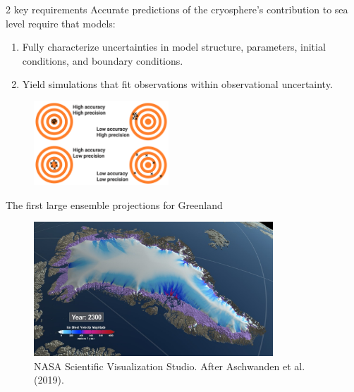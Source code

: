 \documentclass[hide notes,intlimits]{beamer}
\begin{document}
\begin{frame}{2 key requirements}
Accurate predictions of the cryosphere's contribution to sea level require that models:
\begin{enumerate}
    \item<1> Fully characterize uncertainties in model structure, parameters, initial conditions, and boundary conditions.
    \item<1-2> Yield simulations that fit observations within observational uncertainty. 
\end{enumerate}
  \begin{figure}
    \includegraphics[width=0.45\textwidth]{difference-accuracy-and-precision}
  \end{figure}
\end{frame}

\begin{frame}{The first large ensemble projections for Greenland}
  \begin{figure}
    \includegraphics[width=0.8\textwidth]{Greenland_RCP_85_2008_2300_comp_4k.0293_print}
    \caption{NASA Scientific Visualization Studio. After Aschwanden et al. (2019).}
  \end{figure}
\end{frame}
\end{document}

